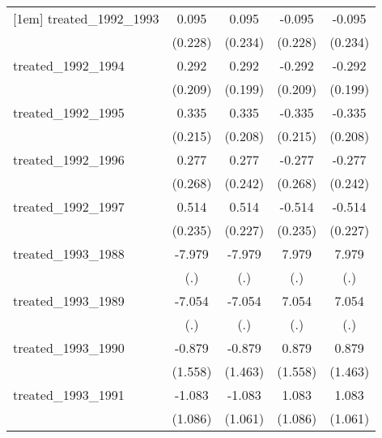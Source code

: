 {\begin{tabular}{l*{4}{c}}
[1em]
treated\_1992\_1993&       0.095         &       0.095         &      -0.095         &      -0.095         \\
            &     (0.228)         &     (0.234)         &     (0.228)         &     (0.234)         \\
[1em]
treated\_1992\_1994&       0.292         &       0.292         &      -0.292         &      -0.292         \\
            &     (0.209)         &     (0.199)         &     (0.209)         &     (0.199)         \\
[1em]
treated\_1992\_1995&       0.335         &       0.335         &      -0.335         &      -0.335         \\
            &     (0.215)         &     (0.208)         &     (0.215)         &     (0.208)         \\
[1em]
treated\_1992\_1996&       0.277         &       0.277         &      -0.277         &      -0.277         \\
            &     (0.268)         &     (0.242)         &     (0.268)         &     (0.242)         \\
[1em]
treated\_1992\_1997&       0.514\sym{*}  &       0.514\sym{*}  &      -0.514\sym{*}  &      -0.514\sym{*}  \\
            &     (0.235)         &     (0.227)         &     (0.235)         &     (0.227)         \\
[1em]
treated\_1993\_1988&      -7.979         &      -7.979         &       7.979         &       7.979         \\
            &         (.)         &         (.)         &         (.)         &         (.)         \\
[1em]
treated\_1993\_1989&      -7.054         &      -7.054         &       7.054         &       7.054         \\
            &         (.)         &         (.)         &         (.)         &         (.)         \\
[1em]
treated\_1993\_1990&      -0.879         &      -0.879         &       0.879         &       0.879         \\
            &     (1.558)         &     (1.463)         &     (1.558)         &     (1.463)         \\
[1em]
treated\_1993\_1991&      -1.083         &      -1.083         &       1.083         &       1.083         \\
            &     (1.086)         &     (1.061)         &     (1.086)         &     (1.061)         \\

\end{tabular}}
